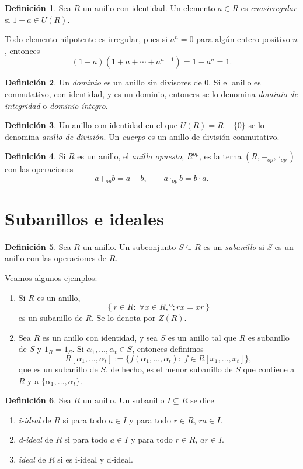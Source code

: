\documentclass[11pt]{book}
\theoremstyle{definition}
\newtheorem{definition}{Definición}[section]
\begin{document}
\begin{definition}
    Sea $R$ un anillo con identidad. Un elemento $a\in R$ es \textit{cuasirregular} si $1-a\in U(R)$.
\end{definition}
Todo elemento nilpotente es irregular, pues si $a^n=0$ para algún entero positivo $n$, entonces \[
(1-a)(1+a+\cdots+a^{n-1})=1-a^n=1.
\]
\begin{definition}
    Un \textit{dominio} es un anillo sin divisores de 0. Si el anillo es conmutativo, con identidad, y es un dominio, entonces se lo denomina \textit{dominio de integridad} o \textit{dominio íntegro}.
\end{definition}
\begin{definition}
    Un anillo con identidad en el que $U(R)=R-\{0\}$ se lo denomina \textit{anillo de división}. Un \textit{cuerpo} es un anillo de división conmutativo.
\end{definition}
\begin{definition}
    Si $R$ es un anillo, el \textit{anillo opuesto}, $R^{op}$, es la terna $(R,+_{op},\cdot_{op})$ con las operaciones\[
    a+_{op}b=a+b,\qquad a\cdot_{op}b=b\cdot a.
    \]
\end{definition}
 
\section{Subanillos e ideales}
\begin{definition}
    Sea $R$ un anillo. Un subconjunto $S\subseteq R$ es un \textit{subanillo} si $S$ es un anillo con las operaciones de $R$.
\end{definition}
Veamos algunos ejemplos:\begin{enumerate}
    \item Si $R$ es un anillo, \[
    \left\{r\in R:\;\forall x\in R,º; rx=xr\right\}
    \]es un subanillo de $R$. Se lo denota por $Z(R)$.
    \item Sea $R$ es un anillo con identidad, y sea $S$ es un anillo tal que $R$ es subanillo de $S$ y $1_R=1_S$. Si $\alpha_1,\dots,\alpha_t\in S$, entonces definimos\[
    R[\alpha_1,\dots,\alpha_t]:=\{f(\alpha_1,\dots,\alpha_t ):\; f\in R[x_1,\dots,x_t]\},
    \]que es un subanillo de $S$. de hecho, es el menor subanillo de $S$ que contiene a $R$ y a $\{\alpha_1,\dots,\alpha_t\}$.
\end{enumerate}
\begin{definition}
    Sea $R$ un anillo. Un subanillo $I\subseteq R$ se dice\begin{enumerate}
        \item \textit{i-ideal} de $R$ si para todo $a\in I$ y para todo $r\in R$, $ra\in I$.
        \item \textit{d-ideal} de $R$ si para todo $a\in I$ y para todo $r\in R$, $ar\in I$.
        \item \textit{ideal} de $R$ si es i-ideal y d-ideal.
    \end{enumerate}
\end{definition}
\end{document}
